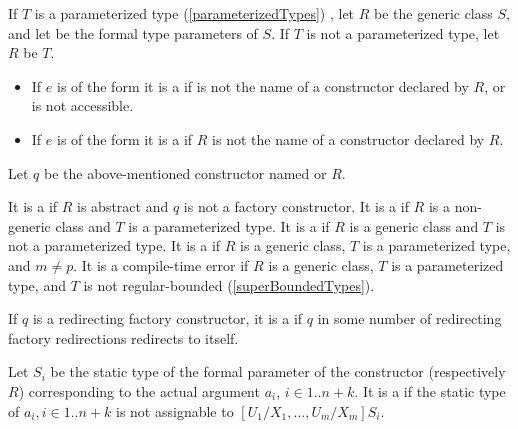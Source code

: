 \documentclass[makeidx]{article}
\begin{document}
{\LMHash{}%
If $T$ is a parameterized type (\ref{parameterizedTypes})
,
let $R$ be the generic class $S$,
and let
be the formal type parameters of $S$.
If $T$ is not a parameterized type, let $R$ be $T$.

\begin{itemize}
\item
  If $e$ is of the form
  it is a  if  is not the name of
  a constructor declared by $R$, or \id{} is not accessible.
\item
  If $e$ is of the form
  it is a  if $R$ is not the name of
  a constructor declared by $R$.
\end{itemize}

\LMHash{}%
Let $q$ be the above-mentioned constructor named  or $R$.

\LMHash{}%
It is a  if $R$ is abstract
and $q$ is not a factory constructor.
It is a  if $R$ is a non-generic class
and $T$ is a parameterized type.
It is a  if $R$ is a generic class
and $T$ is not a parameterized type.
It is a  if $R$ is a generic class,
$T$ is a parameterized type, and $m \not= p$.
It is a compile-time error if $R$ is a generic class,
$T$ is a parameterized type,
and $T$ is not regular-bounded
(\ref{superBoundedTypes}).

\LMHash{}%
If $q$ is a redirecting factory constructor,
it is a  if $q$ in some number of
redirecting factory redirections redirects to itself.

\LMHash{}%
Let $S_i$ be the static type of
the formal parameter of the constructor  (respectively $R$)
corresponding to the actual argument $a_i$, $i \in 1 .. n+k$.
It is a  if the static type of
$a_i, i \in 1 .. n + k$
is not assignable to $[U_1/X_1, \ldots, U_m/X_m]S_i$.

}
\end{document}
